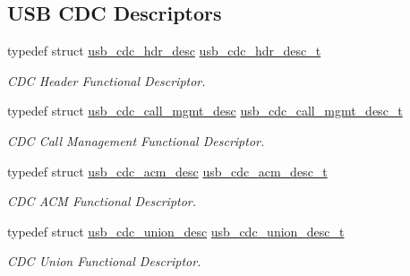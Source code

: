 \subsection*{U\+SB C\+DC Descriptors}
\begin{DoxyCompactItemize}
\item 
\mbox{\label{group__cdc__protocol__group_ga12d62552fff01851269b3cf927a3982e}} 
typedef struct \hyperlink{structusb__cdc__hdr__desc}{usb\+\_\+cdc\+\_\+hdr\+\_\+desc} \hyperlink{group__cdc__protocol__group_ga12d62552fff01851269b3cf927a3982e}{usb\+\_\+cdc\+\_\+hdr\+\_\+desc\+\_\+t}
\begin{DoxyCompactList}\small\item\em C\+DC Header Functional Descriptor. \end{DoxyCompactList}\item 
\mbox{\label{group__cdc__protocol__group_ga6999f792e477f13f5a89351f956ca372}} 
typedef struct \hyperlink{structusb__cdc__call__mgmt__desc}{usb\+\_\+cdc\+\_\+call\+\_\+mgmt\+\_\+desc} \hyperlink{group__cdc__protocol__group_ga6999f792e477f13f5a89351f956ca372}{usb\+\_\+cdc\+\_\+call\+\_\+mgmt\+\_\+desc\+\_\+t}
\begin{DoxyCompactList}\small\item\em C\+DC Call Management Functional Descriptor. \end{DoxyCompactList}\item 
\mbox{\label{group__cdc__protocol__group_ga3c0e7058e94628e8a4c9782b741f7dbb}} 
typedef struct \hyperlink{structusb__cdc__acm__desc}{usb\+\_\+cdc\+\_\+acm\+\_\+desc} \hyperlink{group__cdc__protocol__group_ga3c0e7058e94628e8a4c9782b741f7dbb}{usb\+\_\+cdc\+\_\+acm\+\_\+desc\+\_\+t}
\begin{DoxyCompactList}\small\item\em C\+DC A\+CM Functional Descriptor. \end{DoxyCompactList}\item 
\mbox{\label{group__cdc__protocol__group_gadd60e7e0096730f029d68b36a6389085}} 
typedef struct \hyperlink{structusb__cdc__union__desc}{usb\+\_\+cdc\+\_\+union\+\_\+desc} \hyperlink{group__cdc__protocol__group_gadd60e7e0096730f029d68b36a6389085}{usb\+\_\+cdc\+\_\+union\+\_\+desc\+\_\+t}
\begin{DoxyCompactList}\small\item\em C\+DC Union Functional Descriptor. \end{DoxyCompactList}\item 

\end{DoxyCompactItemize}
